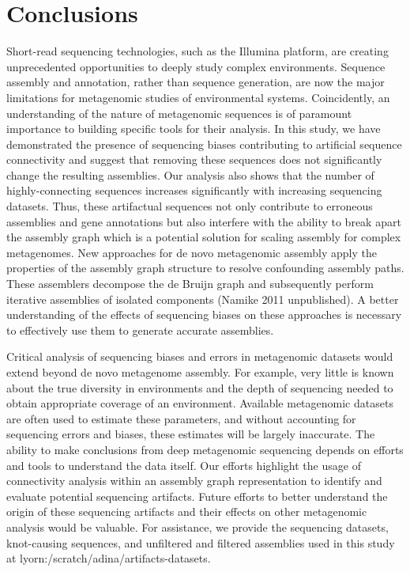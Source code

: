\documentclass[11pt]{article} %
\begin{document}
\section{Conclusions}

Short-read sequencing technologies, such as the Illumina platform, are creating unprecedented opportunities to deeply study complex environments.  Sequence assembly and annotation, rather than sequence generation, are now the major limitations for metagenomic studies of environmental systems.  Coincidently, an understanding of the nature of metagenomic sequences is of paramount importance to building specific tools for their analysis.  In this study, we have demonstrated the presence of sequencing biases contributing to artificial sequence connectivity and suggest that removing these sequences does not significantly change the resulting assemblies. Our analysis also shows that the number of highly-connecting sequences increases significantly with increasing sequencing datasets.  Thus, these artifactual sequences not only contribute to erroneous assemblies and gene annotations but also interfere with the ability to break apart the assembly graph which is a potential solution for scaling assembly for complex metagenomes. New approaches for de novo metagenomic assembly apply the properties of the assembly graph structure to resolve confounding assembly paths. These assemblers decompose the de Bruijn graph and subsequently perform iterative assemblies of isolated components \cite{Peng:2011p898} (Namike 2011 unpublished).  A better understanding of the effects of sequencing biases on these approaches is necessary to effectively use them to generate accurate assemblies.  

	Critical analysis of sequencing biases and errors in metagenomic datasets would extend beyond de novo metagenome assembly.  For example, very little is known about the true diversity in environments and the depth of sequencing needed to obtain appropriate coverage of an environment.  Available metagenomic datasets are often used to estimate these parameters, and without accounting for sequencing errors and biases, these estimates will be largely inaccurate.  The ability to make conclusions from deep metagenomic sequencing depends on efforts and tools to understand the data itself.  Our efforts highlight the usage of connectivity analysis within an assembly graph representation to identify and evaluate potential sequencing artifacts.  Future efforts to better understand the origin of these sequencing artifacts and their effects on other metagenomic analysis would be valuable.  For assistance, we provide the sequencing datasets, knot-causing sequences, and unfiltered and filtered assemblies used in this study at lyorn:/scratch/adina/artifacts-datasets.
	
\end{document}
